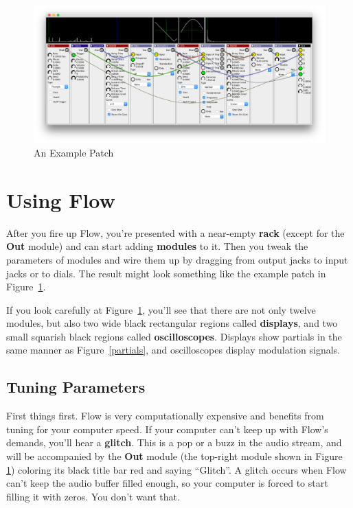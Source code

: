 \documentclass{article}
\newcommand\bump{\vspace{20in}}
\newcommand\name{Flow}
\begin{document}
\begin{figure}[t]
\begin{center}\includegraphics[width=6.5in]{screenshot}\end{center}
\vspace{-3em}
\caption{An Example Patch}
\label{screenshot}
\end{figure}


\bump
\section{Using {\name}}

After you fire up {\name}, you're presented with a near-empty {\bf rack} (except for the {\bf Out} module) and can start adding {\bf modules} to it.  Then you tweak the parameters of modules and wire them up by dragging from output jacks to input jacks or to dials.  The result might look something like the example patch in Figure~\ref{screenshot}.

If you look carefully at Figure~\ref{screenshot}, you'll see that there are not only twelve modules, but also two wide black rectangular regions called {\bf displays}, and two small squarish black regions called {\bf oscilloscopes}.  Displays show partials in the same manner as Figure~\ref{partials}, and oscilloscopes display modulation signals.

\subsection{Tuning Parameters}
First things first.  {\name} is very computationally expensive and benefits from tuning for your computer speed.  If your computer can't keep up with Flow's demands, you'll hear a {\bf glitch}.  This is a pop or a buzz in the audio stream, and will be accompanied by the {\bf Out} module (the top-right module shown in Figure \ref{screenshot}) coloring its black title bar red and saying ``Glitch''.  A glitch occurs when Flow can't keep the audio buffer filled enough, so your computer is forced to start filling it with zeros.  You don't want that.
\end{document}
